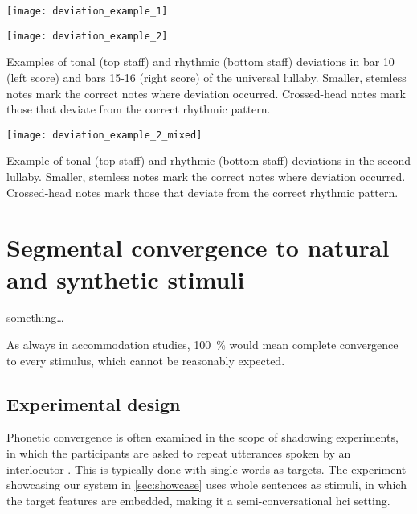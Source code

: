 \begin{snippet}[t]
	\begin{minipage}{.40\linewidth}
		\centering
		\texttt{[image: deviation\_example\_1]}
		\label{fig:deviation_example_1}
	\end{minipage}%
	\hfill
	\begin{minipage}{.50\linewidth}
		\centering
		\texttt{[image: deviation\_example\_2]}
		\label{fig:deviation_example_2}
	\end{minipage}%
	\caption{Examples of tonal (top staff) and rhythmic (bottom staff) deviations in bar 10 (left score) and bars 15-16 (right score) of the universal lullaby.
				Smaller, stemless notes mark the correct notes where deviation occurred.
				Crossed-head notes mark those that deviate from the correct rhythmic pattern.}
\end{snippet}

\begin{snippet}[t]
	\centering
	\texttt{[image: deviation\_example\_2\_mixed]}
	\caption{Example of tonal (top staff) and rhythmic (bottom staff) deviations in the second lullaby.
			Smaller, stemless notes mark the correct notes where deviation occurred.
			Crossed-head notes mark those that deviate from the correct rhythmic pattern.}
	\label{snippet:deviation_example}
\end{snippet}

\section{Segmental convergence to natural and synthetic stimuli}
\label{sec:convergence_to_natural_and_synthetic_stimuli}

something\ldots

As always in accommodation studies, \SI{100}{\percent} would mean complete convergence to every stimulus, which cannot be reasonably expected.

\subsection{Experimental design}
\label{subsec:design_HCIConv}

Phonetic convergence is often examined in the scope of shadowing experiments, in which the participants are asked to repeat utterances spoken by an interlocutor \citep[e.g.,][]{Pardo2017phonetic, Dias2016visibilivty, Walker2015repeat, Shockley2004imitation}.
This is typically done with single words as targets.
The experiment showcasing our system in \cref{sec:showcase} uses whole sentences as stimuli, in which the target features are embedded, making it a semi-conversational \ac{hci} setting.

